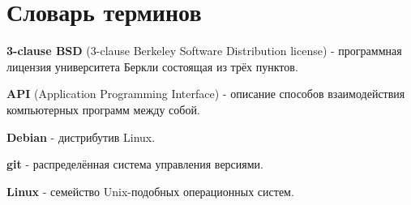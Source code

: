 \chapter*{\centering Словарь терминов}


\textbf{3-­clause BSD} (3-­clause Berkeley Software Distribution license) - программная лицензия университета Беркли состоящая из трёх пунктов.

\textbf{API} (Application Programming Interface) - описание способов взаимодействия компьютерных программ между собой.

\textbf{Debian} - дистрибутив Linux.

\textbf{git} - распределённая система управления версиями.

\textbf{Linux} - семейство Unix-подобных операционных систем.
